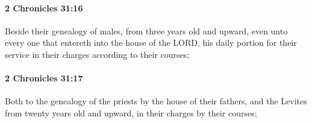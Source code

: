 		\paragraph{2 Chronicles 31:16} %
			\label{2CHRONICLES-31-16}

			Beside their genealogy of males, from three years old and upward, even unto every one that entereth into the house of the LORD, his daily portion for their service in their charges according to their courses;


		\paragraph{2 Chronicles 31:17} %
			\label{2CHRONICLES-31-17}

			Both to the genealogy of the priests by the house of their fathers, and the Levites from twenty years old and upward, in their charges by their courses;


